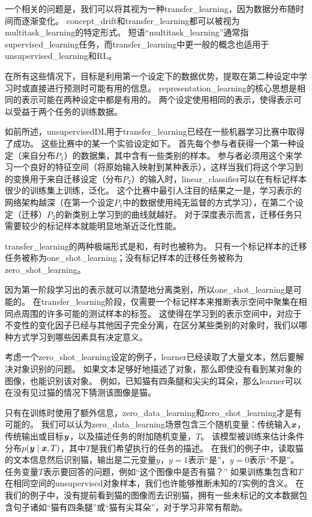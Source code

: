 
一个相关的问题是，我们可以将其视为一种\gls{transfer_learning}，因为数据分布随时间而逐渐变化。
\gls{concept_drift}和\gls{transfer_learning}都可以被视为\gls{multitask_learning}的特定形式。
短语``\gls{multitask_learning}''通常指\gls{supervised_learning}任务，而\gls{transfer_learning}中更一般的概念也适用于\gls{unsupervised_learning}和\gls{RL}。

在所有这些情况下，目标是利用第一个设定下的数据优势，提取在第二种设定中学习时或直接进行预测时可能有用的信息。
\gls{representation_learning}的核心思想是相同的表示可能在两种设定中都是有用的。
两个设定使用相同的表示，使得表示可以受益于两个任务的训练数据。


如前所述，\gls{unsupervised}\gls{DL}用于\gls{transfer_learning}已经在一些机器学习比赛中取得了成功\citep{UTLC+LISA-2011-small,goodfellow+all-NIPS2011}。
这些比赛中的某一个实验设定如下。
首先每个参与者获得一个第一种设定（来自分布$P_1$）的数据集，其中含有一些类别的样本。
参与者必须用这个来学习一个良好的特征空间（将原始输入映射到某种表示），这样当我们将这个学习到的变换用于来自迁移设定（分布$P_2$）的输入时，\gls{linear_classifier}可以在有标记样本很少的训练集上训练，泛化。
这个比赛中最引人注目的结果之一是，学习表示的网络架构越深（在第一个设定$P_1$中的数据使用纯无监督的方式学习），在第二个设定（迁移）$P_2$的新类别上学习到的曲线就越好。
对于深度表示而言，迁移任务只需要较少的标记样本就能明显地渐近泛化性能。


\gls{transfer_learning}的两种极端形式是和，有时也被称为。
只有一个标记样本的迁移任务被称为\gls{one_shot_learning}；没有标记样本的迁移任务被称为\gls{zero_shot_learning}。


因为第一阶段学习出的表示就可以清楚地分离类别，所以\gls{one_shot_learning}\citep{Fei-Fei+al-2006}是可能的。
在\gls{transfer_learning}阶段，仅需要一个标记样本来推断表示空间中聚集在相同点周围的许多可能的测试样本的标签。
这使得在学习到的表示空间中，对应于不变性的变化因子已经与其他因子完全分离，在区分某些类别的对象时，我们以哪种方式学习到哪些因素具有决定意义。


考虑一个\gls{zero_shot_learning}设定的例子，\gls{learner}已经读取了大量文本，然后要解决对象识别的问题。
如果文本足够好地描述了对象，那么即使没有看到某对象的图像，也能识别该对象。
例如，已知猫有四条腿和尖尖的耳朵，那么\gls{learner}可以在没有见过猫的情况下猜测该图像是猫。


只有在训练时使用了额外信息，\gls{zero_data_learning}\citep{Larochelle2008}和\gls{zero_shot_learning}\citep{Palatucci2009,Socher-2013}才是有可能的。
我们可以认为\gls{zero_data_learning}场景包含三个随机变量：传统输入$\boldsymbol{\mathit{x}}$，传统输出或目标$\boldsymbol{\mathit{y}}$，以及描述任务的附加随机变量，$T$。
该模型被训练来估计条件分布$p(\boldsymbol{\mathit{y}} \mid \boldsymbol{\mathit{x}}, T)$，其中$T$是我们希望执行的任务的描述。
在我们的例子中，读取猫的文本信息然后识别猫，输出是二元变量$y$，$y=1$表示``是''，$y=0$表示``不是''。
任务变量$T$表示要回答的问题，例如``这个图像中是否有猫？''
如果训练集包含和$T$在相同空间的\gls{unsupervised}对象样本，我们也许能够推断未知的$T$实例的含义。
在我们的例子中，没有提前看到猫的图像而去识别猫，拥有一些未标记的文本数据包含句子诸如``猫有四条腿''或``猫有尖耳朵''，对于学习非常有帮助。

